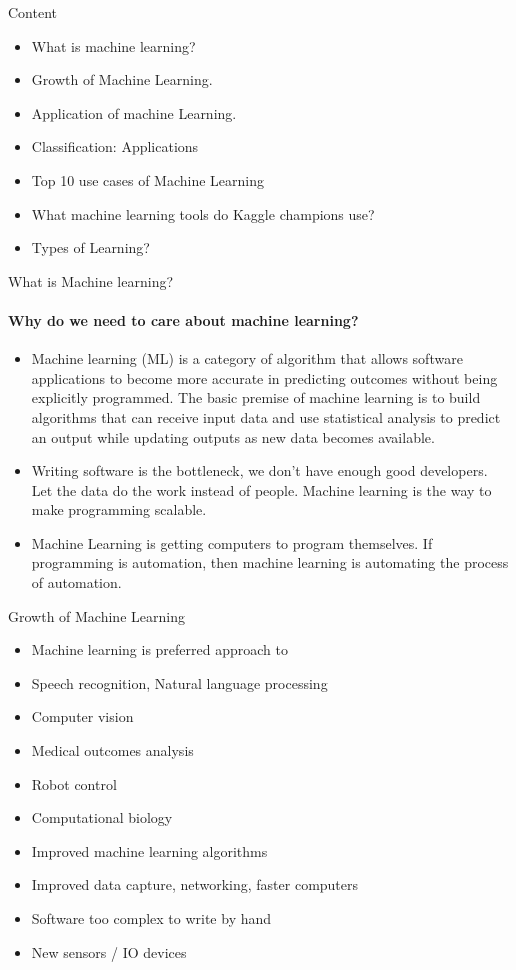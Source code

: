 \documentclass{beamer}
\begin{document}
\begin{frame}{Content}
\begin{itemize}
\item What is machine learning? 
\item Growth of Machine Learning.
\item Application of machine Learning. 
\item Classification:  Applications
 \item Top 10 use cases of Machine Learning
 \item What machine learning tools do Kaggle champions use?
    \item Types of Learning? 
\end{itemize}
\end{frame}
\begin{frame}{What is Machine learning?}
\framesubtitle{Why do we need to care about machine learning?}
\begin{itemize}
    \item Machine learning (ML) is a category of algorithm that allows software applications to become more accurate in predicting outcomes without being explicitly programmed. The basic premise of machine learning is to build algorithms that can receive input data and use statistical analysis to predict an output while updating outputs as new data becomes available.
    \item Writing software is the bottleneck, we don’t have enough good developers. Let the data do the work instead of people. Machine learning is the way to make programming scalable.
    \item Machine Learning is getting computers to program themselves. If programming is automation, then machine learning is automating the process of automation.
\end{itemize}
\end{frame}
\begin{frame}{Growth of Machine Learning}
   \begin{itemize}
       \item Machine learning is preferred approach to
       \item Speech recognition, Natural language processing
       \item Computer vision
       \item Medical outcomes analysis
    \item Robot control
    \item Computational biology
    \item Improved machine learning algorithms
    \item Improved data capture, networking, faster computers
    \item Software too complex to write by hand
    \item New sensors / IO devices
\end{itemize}
\end{frame}
\end{document}
